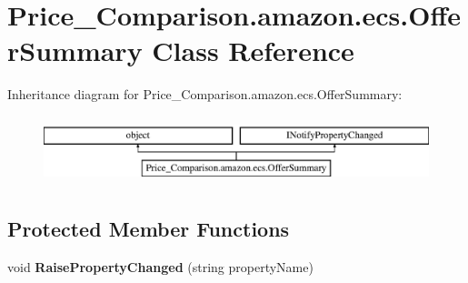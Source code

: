 \hypertarget{class_price___comparison_1_1amazon_1_1ecs_1_1_offer_summary}{\section{Price\-\_\-\-Comparison.\-amazon.\-ecs.\-Offer\-Summary Class Reference}
\label{class_price___comparison_1_1amazon_1_1ecs_1_1_offer_summary}
}


 


Inheritance diagram for Price\-\_\-\-Comparison.\-amazon.\-ecs.\-Offer\-Summary\-:\begin{figure}[H]
\begin{center}
\leavevmode
\includegraphics[height=1.992882cm]{class_price___comparison_1_1amazon_1_1ecs_1_1_offer_summary}
\end{center}
\end{figure}
\subsection*{Protected Member Functions}
\begin{DoxyCompactItemize}
\item 
\hypertarget{class_price___comparison_1_1amazon_1_1ecs_1_1_offer_summary_a69ba30c09b9ba9f4f9e0fce8bac46295}{void {\bfseries Raise\-Property\-Changed} (string property\-Name)}\label{class_price___comparison_1_1amazon_1_1ecs_1_1_offer_summary_a69ba30c09b9ba9f4f9e0fce8bac46295}

\end{DoxyCompactItemize}
